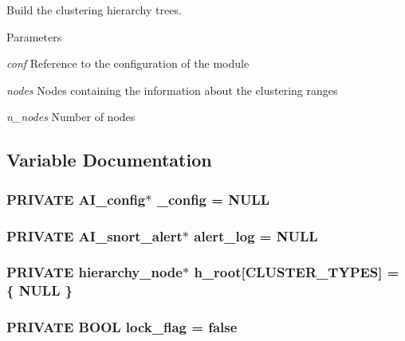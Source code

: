 Build the clustering hierarchy trees. 


\begin{DoxyParams}{Parameters}
\item[{\em conf}]Reference to the configuration of the module \item[{\em nodes}]Nodes containing the information about the clustering ranges \item[{\em n\_\-nodes}]Number of nodes \end{DoxyParams}


\subsection{Variable Documentation}
\hypertarget{group__cluster_ga91458e2d34595688e39fcb63ba418849}{
\subsubsection[{\_\-config}]{\setlength{\rightskip}{0pt plus 5cm}PRIVATE {\bf AI\_\-config}$\ast$ {\bf \_\-config} = NULL}}
\label{group__cluster_ga91458e2d34595688e39fcb63ba418849}
\hypertarget{group__cluster_gaaf4c19f60f48741b0890c6114dcff7d9}{
\subsubsection[{alert\_\-log}]{\setlength{\rightskip}{0pt plus 5cm}PRIVATE {\bf AI\_\-snort\_\-alert}$\ast$ {\bf alert\_\-log} = NULL}}
\label{group__cluster_gaaf4c19f60f48741b0890c6114dcff7d9}
\hypertarget{group__cluster_ga97d35425cf5a0207fb50b64ee8cdda82}{
\subsubsection[{h\_\-root}]{\setlength{\rightskip}{0pt plus 5cm}PRIVATE {\bf hierarchy\_\-node}$\ast$ {\bf h\_\-root}\mbox{[}CLUSTER\_\-TYPES\mbox{]} = \{ NULL \}}}
\label{group__cluster_ga97d35425cf5a0207fb50b64ee8cdda82}
\hypertarget{group__cluster_gafebc81c042a632dc987e113b7f390274}{
\subsubsection[{lock\_\-flag}]{\setlength{\rightskip}{0pt plus 5cm}PRIVATE {\bf BOOL} {\bf lock\_\-flag} = false}}
\label{group__cluster_gafebc81c042a632dc987e113b7f390274}
